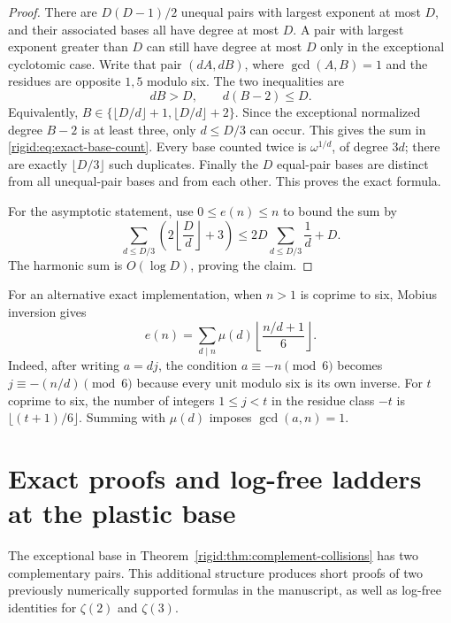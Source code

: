 \begin{proof}
There are $D(D-1)/2$ unequal pairs with largest exponent at most
$D$, and their associated bases all have degree at most $D$.
A pair with largest exponent greater than $D$ can still have degree
at most $D$ only in the exceptional cyclotomic case.  Write that
pair $(dA,dB)$, where $\gcd(A,B)=1$ and the residues are opposite
$1,5$ modulo six.  The two inequalities are
\[
dB>D,\qquad d(B-2)\le D.
\]
Equivalently,
$B\in\{\lfloor D/d\rfloor+1,\lfloor D/d\rfloor+2\}$.
Since the exceptional normalized degree $B-2$ is at least three,
only $d\le D/3$ can occur.  This gives the sum in
\eqref{rigid:eq:exact-base-count}.
Every base counted twice is $\omega^{1/d}$, of degree $3d$;
there are exactly $\lfloor D/3\rfloor$ such duplicates.
Finally the $D$ equal-pair bases are distinct from all unequal-pair
bases and from each other.  This proves the exact formula.

For the asymptotic statement, use $0\le e(n)\le n$ to bound the sum
by
\[
\sum_{d\le D/3}\left(2\left\lfloor\frac Dd\right\rfloor+3\right)
\le2D\sum_{d\le D/3}\frac1d+D.
\]
The harmonic sum is $O(\log D)$, proving the claim.
\end{proof}

For an alternative exact implementation, when $n>1$ is coprime to
six, Mobius inversion gives
\begin{equation}
e(n)=\sum_{d\mid n}\mu(d)
       \left\lfloor\frac{n/d+1}{6}\right\rfloor.
\label{rigid:eq:exceptional-count-mobius}
\end{equation}
Indeed, after writing $a=dj$, the condition
$a\equiv-n\pmod6$ becomes $j\equiv-(n/d)\pmod6$ because every
unit modulo six is its own inverse.  For $t$ coprime to six,
the number of integers $1\le j<t$ in the residue class $-t$
is $\lfloor(t+1)/6\rfloor$.  Summing with $\mu(d)$ imposes
$\gcd(a,n)=1$.


\section{Exact proofs and log-free ladders at the plastic base}
\label{rigid:sec:plastic-proofs}

The exceptional base in Theorem~\ref{rigid:thm:complement-collisions}
has two complementary pairs.  This additional structure produces
short proofs of two previously numerically supported formulas in
the manuscript, as well as log-free identities for $\zeta(2)$ and
$\zeta(3)$.


